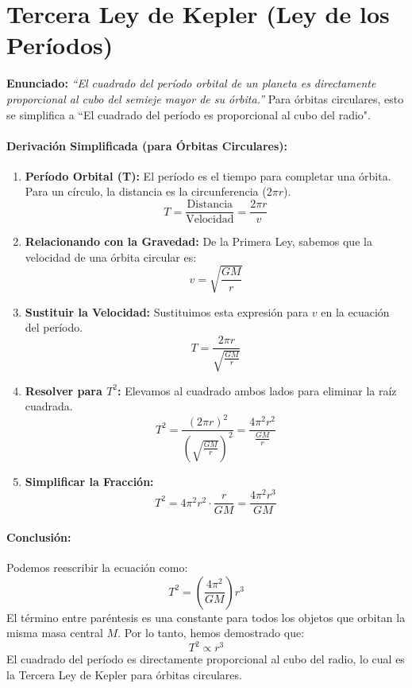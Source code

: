\documentclass[11pt,a4paper]{book}
\begin{document}
\section*{Tercera Ley de Kepler (Ley de los Períodos)}
\textbf{Enunciado:} \textit{“El cuadrado del período orbital de un planeta es directamente proporcional al cubo del semieje mayor de su órbita.”} Para órbitas circulares, esto se simplifica a ``El cuadrado del período es proporcional al cubo del radio".

\paragraph{Derivación Simplificada (para Órbitas Circulares):}
\begin{enumerate}
    \item \textbf{Período Orbital (T):} El período es el tiempo para completar una órbita. Para un círculo, la distancia es la circunferencia ($2\pi r$).
    \[ T = \frac{\text{Distancia}}{\text{Velocidad}} = \frac{2\pi r}{v} \]

    \item \textbf{Relacionando con la Gravedad:} De la Primera Ley, sabemos que la velocidad de una órbita circular es:
    \[ v = \sqrt{\frac{GM}{r}} \]

    \item \textbf{Sustituir la Velocidad:} Sustituimos esta expresión para $v$ en la ecuación del período.
    \[ T = \frac{2\pi r}{\sqrt{\frac{GM}{r}}} \]

    \item \textbf{Resolver para $T^2$:} Elevamos al cuadrado ambos lados para eliminar la raíz cuadrada.
    \[ T^2 = \frac{(2\pi r)^2}{\left(\sqrt{\frac{GM}{r}}\right)^2} = \frac{4\pi^2 r^2}{\frac{GM}{r}} \]

    \item \textbf{Simplificar la Fracción:}
    \[ T^2 = 4\pi^2 r^2 \cdot \frac{r}{GM} = \frac{4\pi^2 r^3}{GM} \]
\end{enumerate}
\paragraph{Conclusión:}
Podemos reescribir la ecuación como:
\[ T^2 = \left(\frac{4\pi^2}{GM}\right) r^3 \]
El término entre paréntesis es una constante para todos los objetos que orbitan la misma masa central $M$. Por lo tanto, hemos demostrado que:
\[ T^2 \propto r^3 \]
El cuadrado del período es directamente proporcional al cubo del radio, lo cual es la Tercera Ley de Kepler para órbitas circulares.
\end{document}
